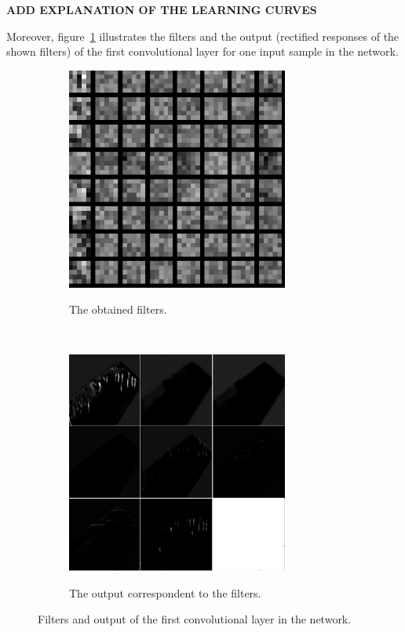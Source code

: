 \textbf{ADD EXPLANATION OF THE LEARNING CURVES}

\noindent Moreover, figure~\ref{fig:conv1tot} illustrates the filters and the output (rectified responses of the shown filters) of the first convolutional layer for one input sample in the network.

\begin{figure}[h!]
    \centering
    \begin{subfigure}[t]{0.5\textwidth}
        \centering
        {\includegraphics[width=0.8\textwidth]{images/conv2feat}}
        \caption{The obtained filters.}
    \end{subfigure}%
    ~ 
    \begin{subfigure}[t]{0.5\textwidth}
        \centering
        {\includegraphics[width=0.8\textwidth]{images/conv1out}}
        \caption{The output correspondent to the filters.}
    \end{subfigure}
    \caption{Filters and output of the first convolutional layer in the network.}
    \label{fig:conv1tot}
\end{figure}

